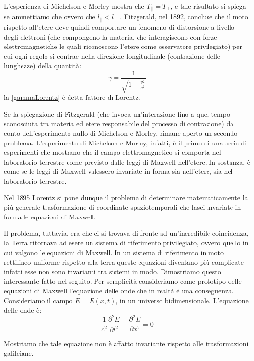 L'esperienza di Michelson e Morley mostra che $T_{\parallel} = T_{\bot}$, e tale risultato si
spiega se ammettiamo che ovvero che $l_{\parallel} < l_{\bot}$ . Fitzgerald, nel 1892, 
concluse che il moto rispetto all'etere deve quindi comportare un fenomeno di distorsione a livello degli elettroni
(che compongono la materia, che interagiscono con forze elettromagnetiche
le quali riconoscono l'etere come osservatore privilegiato) per cui ogni regolo
si contrae nella direzione longitudinale (contrazione
delle lunghezze) della quantità:
\begin{equation}\label{gammaLorentz}
 \gamma = \dfrac{1}{\sqrt{1 - \frac{v^2}{c^2}}}
\end{equation}
la \ref{gammaLorentz} è detta fattore di Lorentz.

Se la spiegazione di Fitzgerald (che invoca un'interazione fino a quel tempo
sconosciuta tra materia ed etere responsabile del processo di contrazione)
da conto dell'esperimento nullo di Michelson e Morley, rimane aperto un secondo problema. 
L'esperimento di Michelson e Morley, infatti, è il primo
di una serie di esperimenti che mostrano che il campo elettromagnetico si
comporta nel laboratorio terrestre come previsto dalle leggi di Maxwell nell'etere. 
In sostanza, è come se le leggi di Maxwell valessero invariate in forma
sia nell'etere, sia nel laboratorio terrestre.

Nel 1895 Lorentz si pone dunque il problema di determinare matematicamente 
la più generale trasformazione di coordinate spaziotemporali che
lasci invariate in forma le equazioni di Maxwell. 

Il problema, tuttavia, era che ci si trovava di fronte ad un'incredibile coincidenza, la Terra
ritornava ad esere un sistema di riferimento privilegiato, ovvero quello in cui valgono le equazioni
di Maxwell. In un sistema di riferimento in moto rettilineo uniforme rispetto alla terra queste
equazioni diventano più complicate infatti esse non sono invarianti tra sistemi in modo. Dimostriamo questo
interessante fatto nel seguito. Per semplicità consideriamo come prototipo delle equazioni di Maxwell 
l'equazione delle onde  che in realtà è una conseguenza. 
Consideriamo il campo $E = E(x, t)$, in un universo bidimensionale. L'equazione delle onde è:
\begin{equation}
 \frac{1}{c^2} \dfrac{\partial^2 E}{\partial t^2} - \dfrac{\partial^2 E}{\partial x^2} = 0
\end{equation}

Mostriamo che tale equazione non è affatto invariante rispetto alle trasformazioni 
galileiane.

